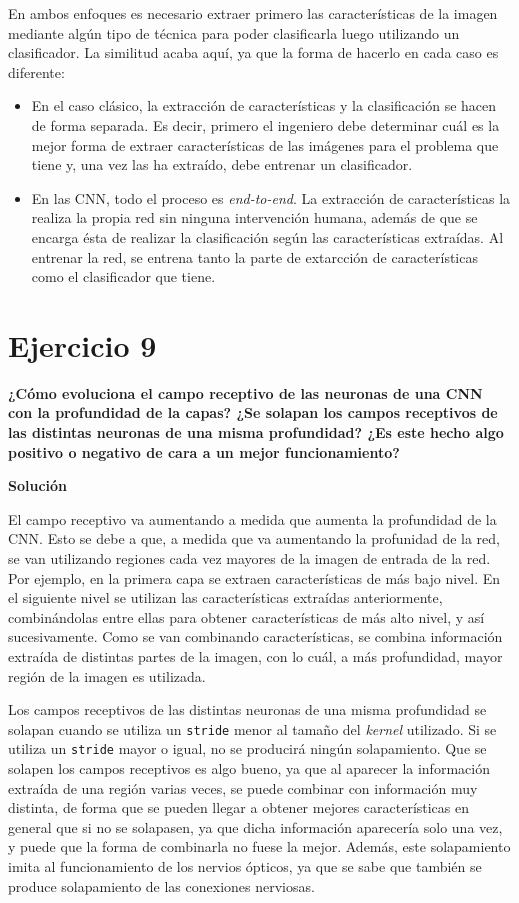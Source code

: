 \documentclass[11pt,a4paper]{article}
\newcommand{\answer}{\noindent\textbf{Solución}}
\newcommand{\question}[1]{\noindent\textbf{#1}}
\newcommand{\nonumsection}[1]{\section*{#1}\addcontentsline{toc}{section}{#1}}
\begin{document}
En ambos enfoques es necesario extraer primero las características de
la imagen mediante algún tipo de técnica para poder clasificarla luego
utilizando un clasificador. La similitud acaba aquí, ya que
la forma de hacerlo en cada caso es diferente:

\begin{itemize}[label=\textbullet]
  \item En el caso clásico, la extracción de características y la
  clasificación se hacen de forma separada. Es decir, primero el ingeniero
  debe determinar cuál es la mejor forma de extraer características de las
  imágenes para el problema que tiene y, una vez las ha extraído, debe
  entrenar un clasificador.
  \item En las CNN, todo el proceso es \textit{end-to-end}. La extracción
  de características la realiza la propia red sin ninguna intervención humana,
  además de que se encarga ésta de realizar la clasificación según las características
  extraídas. Al entrenar la red, se entrena tanto la parte de extarcción
  de características como el clasificador que tiene.
\end{itemize}


\nonumsection{Ejercicio 9}

\question{¿Cómo evoluciona el campo receptivo de las neuronas de una CNN
con la profundidad de la capas? ¿Se solapan los campos receptivos de
las distintas neuronas de una misma profundidad? ¿Es este hecho algo
positivo o negativo de cara a un mejor funcionamiento?}

\answer

El campo receptivo va aumentando a medida que aumenta la profundidad de la
CNN. Esto se debe a que, a medida que va aumentando la profunidad de la red,
se van utilizando regiones cada vez mayores de la imagen de entrada de la red.
Por ejemplo, en la primera capa se extraen características de más bajo nivel. En
el siguiente nivel se utilizan las características extraídas anteriormente,
combinándolas entre ellas para obtener características de más alto nivel, y así
sucesivamente. Como se van combinando características, se combina información extraída
de distintas partes de la imagen, con lo cuál, a más profundidad, mayor región
de la imagen es utilizada.

Los campos receptivos de las distintas neuronas de una misma profundidad
se solapan cuando se utiliza un \texttt{stride} menor al tamaño del
\textit{kernel} utilizado. Si se utiliza un \texttt{stride} mayor o igual, no
se producirá ningún solapamiento. Que se solapen los campos receptivos es algo
bueno, ya que al aparecer la información extraída de una región varias veces,
se puede combinar con información muy distinta, de forma que se pueden llegar a
obtener mejores características en general que si no se solapasen, ya que dicha
información aparecería solo una vez, y puede que la forma de combinarla no fuese
la mejor. Además, este solapamiento imita al funcionamiento de los nervios ópticos,
ya que se sabe que también se produce solapamiento de las conexiones nerviosas.
\end{document}
